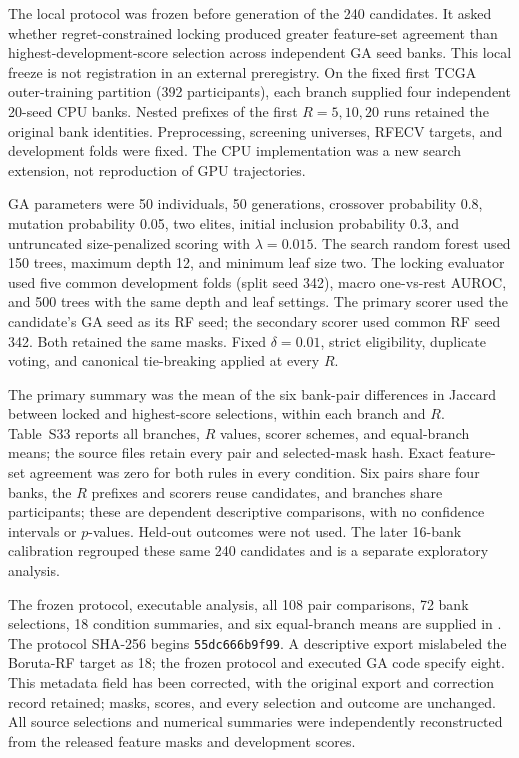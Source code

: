The local protocol was frozen before generation of the 240 candidates. It asked whether regret-constrained locking produced greater feature-set agreement than highest-development-score selection across independent GA seed banks. This local freeze is not registration in an external preregistry. On the fixed first TCGA outer-training partition (392 participants), each branch supplied four independent 20-seed CPU banks. Nested prefixes of the first $R=5,10,20$ runs retained the original bank identities. Preprocessing, screening universes, RFECV targets, and development folds were fixed. The CPU implementation was a new search extension, not reproduction of GPU trajectories.

GA parameters were 50 individuals, 50 generations, crossover probability 0.8, mutation probability 0.05, two elites, initial inclusion probability 0.3, and untruncated size-penalized scoring with $\lambda=0.015$. The search random forest used 150 trees, maximum depth 12, and minimum leaf size two. The locking evaluator used five common development folds (split seed 342), macro one-vs-rest AUROC, and 500 trees with the same depth and leaf settings. The primary scorer used the candidate's GA seed as its RF seed; the secondary scorer used common RF seed 342. Both retained the same masks. Fixed $\delta=0.01$, strict eligibility, duplicate voting, and canonical tie-breaking applied at every $R$.

The primary summary was the mean of the six bank-pair differences in Jaccard between locked and highest-score selections, within each branch and $R$. Table~S33 reports all branches, $R$ values, scorer schemes, and equal-branch means; the source files retain every pair and selected-mask hash. Exact feature-set agreement was zero for both rules in every condition. Six pairs share four banks, the $R$ prefixes and scorers reuse candidates, and branches share participants; these are dependent descriptive comparisons, with no confidence intervals or $p$-values. Held-out outcomes were not used. The later 16-bank calibration regrouped these same 240 candidates and is a separate exploratory analysis.

The frozen protocol, executable analysis, all 108 pair comparisons, 72 bank selections, 18 condition summaries, and six equal-branch means are supplied in . The protocol SHA-256 begins \texttt{55dc666b9f99}. A descriptive export mislabeled the Boruta-RF target as 18; the frozen protocol and executed GA code specify eight. This metadata field has been corrected, with the original export and correction record retained; masks, scores, and every selection and outcome are unchanged. All source selections and numerical summaries were independently reconstructed from the released feature masks and development scores.

